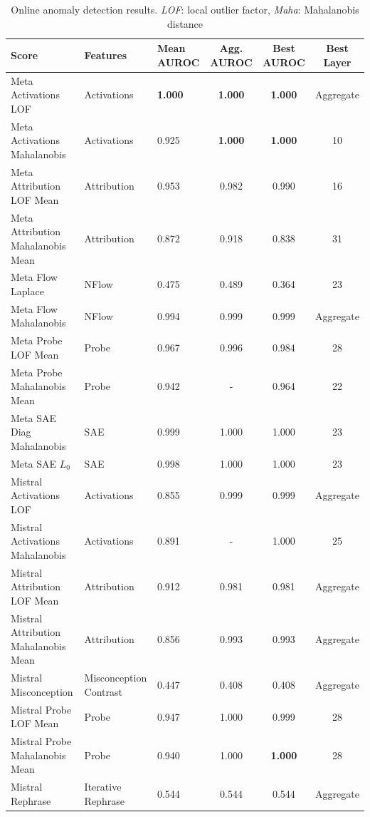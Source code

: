 \begin{table}[H]
\centering
\scriptsize  %
\renewcommand{\arraystretch}{1.2}  %
\setlength{\tabcolsep}{2pt}  %
\begin{tabular}{lp{3cm}lccc}
\toprule
\textbf{Score} & \textbf{Features} & \textbf{Mean AUROC} & \textbf{Agg. AUROC} & \textbf{Best AUROC} & \textbf{Best Layer} \\
\midrule
Meta Activations LOF                 & Activations            & \textbf{1.000}  & \textbf{1.000}  & \textbf{1.000}  & Aggregate \\
Meta Activations Mahalanobis         & Activations            & 0.925  & \textbf{1.000}  & \textbf{1.000}  & 10 \\
Meta Attribution LOF Mean            & Attribution            & 0.953  & 0.982  & 0.990  & 16 \\
Meta Attribution Mahalanobis Mean    & Attribution            & 0.872  & 0.918  & 0.838  & 31 \\
Meta Flow Laplace                    & NFlow                  & 0.475  & 0.489  & 0.364  & 23 \\
Meta Flow Mahalanobis                & NFlow                  & 0.994  & 0.999  & 0.999  & Aggregate \\
Meta Probe LOF Mean                  & Probe                  & 0.967  & 0.996  & 0.984  & 28 \\
Meta Probe Mahalanobis Mean          & Probe                  & 0.942  & -      & 0.964  & 22 \\
Meta SAE Diag Mahalanobis            & SAE                    & 0.999  & 1.000  & 1.000  & 23 \\
Meta SAE $L_0$                          & SAE                    & 0.998  & 1.000  & 1.000  & 23 \\
Mistral Activations LOF              & Activations            & 0.855  & 0.999  & 0.999  & Aggregate \\
Mistral Activations Mahalanobis      & Activations            & 0.891  & -      & 1.000  & 25 \\
Mistral Attribution LOF Mean         & Attribution            & 0.912  & 0.981  & 0.981  & Aggregate \\
Mistral Attribution Mahalanobis Mean & Attribution            & 0.856  & 0.993  & 0.993  & Aggregate \\
Mistral Misconception                & Misconception Contrast & 0.447  & 0.408  & 0.408  & Aggregate \\
Mistral Probe LOF Mean               & Probe                  & 0.947  & 1.000  & 0.999  & 28 \\
Mistral Probe Mahalanobis Mean       & Probe                  & 0.940  & 1.000  & \textbf{1.000}  & 28 \\
Mistral Rephrase                     & Iterative Rephrase     & 0.544  & 0.544  & 0.544  & Aggregate \\
\bottomrule
\end{tabular}
\caption{Online anomaly detection results. \emph{LOF}: local outlier factor, \emph{Maha}: Mahalanobis distance}
\label{tab:online_anomaly_scores}
\end{table}

